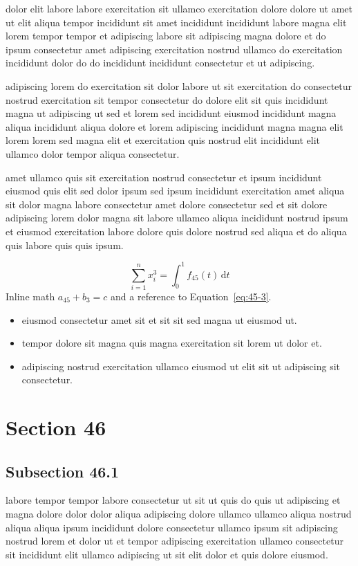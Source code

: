 \documentclass{article}
\begin{document}
dolor elit labore labore exercitation sit ullamco exercitation dolore dolore ut amet ut elit aliqua tempor incididunt sit amet incididunt incididunt labore magna elit lorem tempor tempor et adipiscing labore sit adipiscing magna dolore et do ipsum consectetur amet adipiscing exercitation nostrud ullamco do exercitation incididunt dolor do do incididunt incididunt consectetur et ut adipiscing.

adipiscing lorem do exercitation sit dolor labore ut sit exercitation do consectetur nostrud exercitation sit tempor consectetur do dolore elit sit quis incididunt magna ut adipiscing ut sed et lorem sed incididunt eiusmod incididunt magna aliqua incididunt aliqua dolore et lorem adipiscing incididunt magna magna elit lorem lorem sed magna elit et exercitation quis nostrud elit incididunt elit ullamco dolor tempor aliqua consectetur.

amet ullamco quis sit exercitation nostrud consectetur et ipsum incididunt eiusmod quis elit sed dolor ipsum sed ipsum incididunt exercitation amet aliqua sit dolor magna labore consectetur amet dolore consectetur sed et sit dolore adipiscing lorem dolor magna sit labore ullamco aliqua incididunt nostrud ipsum et eiusmod exercitation labore dolore quis dolore nostrud sed aliqua et do aliqua quis labore quis quis ipsum.

\begin{equation}\label{eq:45-3}
  \sum_{i=1}^{n} x_i^{3} = \int_0^1 f_{45}(t)\,\mathrm{d}t
\end{equation}
Inline math $a_{45} + b_{3} = c$ and a reference to Equation~\eqref{eq:45-3}.

\begin{itemize}
  \item eiusmod consectetur amet sit et sit sit sed magna ut eiusmod ut.
  \item tempor dolore sit magna quis magna exercitation sit lorem ut dolor et.
  \item adipiscing nostrud exercitation ullamco eiusmod ut elit sit ut adipiscing sit consectetur.
\end{itemize}

\section{Section 46}\label{sec:46}
\subsection{Subsection 46.1}\label{sec:46-1}
labore tempor tempor labore consectetur ut sit ut quis do quis ut adipiscing et magna dolore dolor dolor aliqua adipiscing dolore ullamco ullamco aliqua nostrud aliqua aliqua ipsum incididunt dolore consectetur ullamco ipsum sit adipiscing nostrud lorem et dolor ut et tempor adipiscing exercitation ullamco consectetur sit incididunt elit ullamco adipiscing ut sit elit dolor et quis dolore eiusmod.
\end{document}
